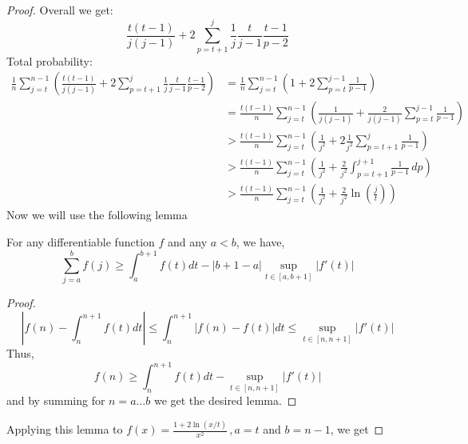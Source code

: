 \begin{proof}
Overall we get:
\begin{equation}
    \frac{t(t - 1)}{j (j - 1)} + 2 \sum_{p = t + 1}^{j}\frac{1}{j}\frac{t}{j - 1}\frac{t-1}{p-2}
\end{equation}
Total probability:
\begin{align*}
    \frac{1}{n} \sum_{j = t}^{n-1}\left(\frac{t(t - 1)}{j (j - 1)} + 2 \sum_{p = t + 1}^{j}\frac{1}{j}\frac{t}{j - 1}\frac{t-1}{p-2}\right) 
    &= 
   \frac{1}{n}\sum_{j = t}^{n-1}\left(1 + 2\sum_{p=t}^{j - 1} \frac{1}{p - 1} \right) \\
   &= 
   \frac{t(t - 1)}{n}\sum_{j=t}^{n-1}\left(\frac{1}{j(j-1)} + \frac{2}{j(j-1)}\sum_{p = t}^{j-1}\frac{1}{p-1}\right)\\
   & >
   \frac{t(t-1)}{n}\sum_{j = t}^{n - 1}\left(\frac{1}{j^2} + 2\frac{1}{j^2}\sum_{p = t + 1}^{j}\frac{1}{p-1}\right) \\
   & >
   \frac{t(t-1)}{n}\sum_{j = t}^{n - 1}\left(\frac{1}{j^2} + \frac{2}{j^2}\int_{p=t+1}^{j+1} \frac{1}{p-1}\, dp \right)\\
   & >
   \frac{t(t-1)}{n}\sum_{j = t}^{n-1}\left(\frac{1}{j^2} + \frac{2}{j^2}\ln\left(\frac{j}{t}\right)\right)
\end{align*}
Now we will use the following lemma
\begin{lemma}
For any differentiable function $f$ and any $a<b$, we have,
\begin{equation}
    \sum_{j=a}^{b} f(j) \geq \int_a^{b+1} f(t) dt - |b+1-a|\sup_{t \in [a,b+1]} |f'(t)|
\end{equation}
\end{lemma}
\begin{proof}
\begin{equation}
     | f(n) - \int_n^{n+1} f(t) dt | \leq \int_n^{n+1} |f(n)-f(t)| dt \leq \sup_{t \in [n,n+1]} |f'(t)| 
\end{equation}
Thus, 
\begin{equation}
    f(n) \geq  \int_n^{n+1} f(t) dt - \sup_{t \in [n,n+1]} |f'(t)| 
\end{equation}
and by summing for $n = a \ldots b$ we get the desired lemma. 
\end{proof}
Applying this lemma to $f(x) = \frac{1+2\ln(x/t)}{x^2}\,, a = t$ and $b=n-1$, we get 

\end{proof}
